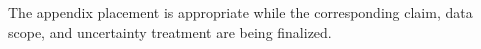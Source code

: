 The appendix placement is appropriate while the corresponding claim, data scope, and uncertainty treatment are being finalized.
